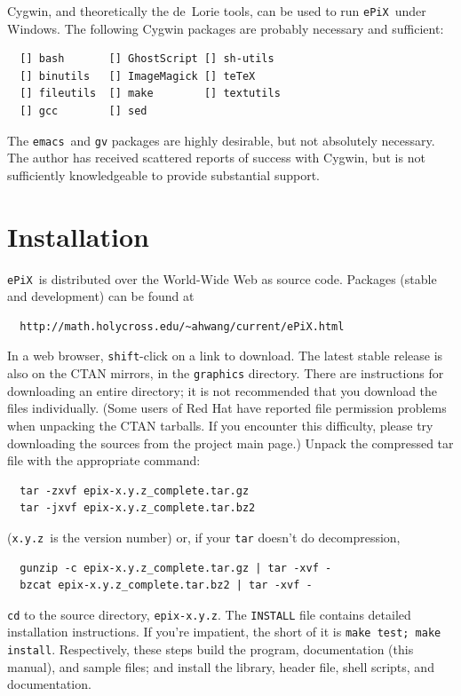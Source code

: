 \documentclass[12pt]{report}
\newcommand{\code}[1]{\texttt{#1}}
\newcommand{\filename}[1]{\texttt{#1}}
\newcommand{\ePiX}{\code{ePiX}}
\begin{document}
Cygwin, and theoretically the de~Lorie tools, can be used to run
\ePiX\ under Windows. The following Cygwin packages are probably
necessary and sufficient: 
\begin{verbatim}
  [] bash       [] GhostScript [] sh-utils
  [] binutils   [] ImageMagick [] teTeX
  [] fileutils  [] make        [] textutils
  [] gcc        [] sed
\end{verbatim}

The \filename{emacs}~and \filename{gv} packages are highly desirable,
but not absolutely necessary. The author has received scattered
reports of success with Cygwin, but is not sufficiently knowledgeable
to provide substantial support.


\section{Installation}

\ePiX\ is distributed over the World-Wide Web as source code. Packages
(stable and development) can be found at
\begin{verbatim}
  http://math.holycross.edu/~ahwang/current/ePiX.html
\end{verbatim}
In a web browser, \texttt{shift}-click on a link to download.  The
latest stable release is also on the CTAN mirrors, in the
\code{graphics} directory. There are instructions for downloading an
entire directory; it is not recommended that you download the files
individually.  (Some users of Red Hat have reported file permission
problems when unpacking the CTAN tarballs. If you encounter this
difficulty, please try downloading the sources from the project main
page.)  Unpack the compressed tar file with the appropriate command:
\begin{verbatim}
  tar -zxvf epix-x.y.z_complete.tar.gz
  tar -jxvf epix-x.y.z_complete.tar.bz2
\end{verbatim}
(\code{x.y.z}~is the version number) or, if your \code{tar}
doesn't do decompression,
\begin{verbatim}
  gunzip -c epix-x.y.z_complete.tar.gz | tar -xvf -
  bzcat epix-x.y.z_complete.tar.bz2 | tar -xvf -
\end{verbatim}
\code{cd} to the source directory, \filename{epix-x.y.z}.  The
\filename{INSTALL} file contains detailed installation instructions.
If you're impatient, the short of it is \code{make test; make
install}.  Respectively, these steps build the program, documentation
(this manual), and sample files; and install the library, header file,
shell scripts, and documentation.
\end{document}
